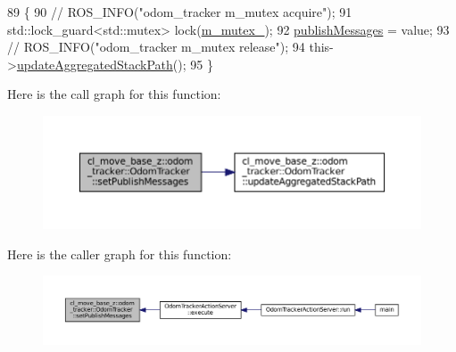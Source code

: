 \begin{DoxyCode}
89 \{
90   \textcolor{comment}{// ROS\_INFO("odom\_tracker m\_mutex acquire");}
91   std::lock\_guard<std::mutex> lock(\hyperlink{classcl__move__base__z_1_1odom__tracker_1_1OdomTracker_aa371639e1eee269273dec8d3ab9dba0f}{m\_mutex\_});
92   \hyperlink{classcl__move__base__z_1_1odom__tracker_1_1OdomTracker_a4f253d45ab5750dee3c2f18dd5599725}{publishMessages} = value;
93   \textcolor{comment}{// ROS\_INFO("odom\_tracker m\_mutex release");}
94   this->\hyperlink{classcl__move__base__z_1_1odom__tracker_1_1OdomTracker_a7922f1e1e688a2ed62d32d9914985a9f}{updateAggregatedStackPath}();
95 \}
\end{DoxyCode}
Here is the call graph for this function\+:
\nopagebreak
\begin{figure}[H]
\begin{center}
\leavevmode
\includegraphics[width=350pt]{classcl__move__base__z_1_1odom__tracker_1_1OdomTracker_a3b3cf9010e4e4fe4f96cfafd5a529517_cgraph}
\end{center}
\end{figure}
Here is the caller graph for this function\+:
\nopagebreak
\begin{figure}[H]
\begin{center}
\leavevmode
\includegraphics[width=350pt]{classcl__move__base__z_1_1odom__tracker_1_1OdomTracker_a3b3cf9010e4e4fe4f96cfafd5a529517_icgraph}
\end{center}
\end{figure}
\mbox{\label{classcl__move__base__z_1_1odom__tracker_1_1OdomTracker_a9f4989c6353022c2ec3b0546c09bf3bc}} 

